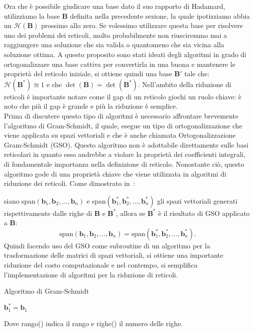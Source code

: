 Ora che è possibile giudicare una base dato il suo rapporto di Hadamard, utilizziamo la base
$\mathbf{B}$ definita nella precedente sezione, la quale ipotizziamo abbia un 
$\mathcal{H}(\mathbf{B})$ prossimo allo zero. Se volessimo utilizzare questa base per risolvere
uno dei problemi dei reticoli, molto probabilmente non riusciremmo mai a raggiungere una soluzione
che sia valida o quantomeno che sia vicina alla soluzione ottima.
A questo proposito sono stati ideati degli algoritmi in grado di ortogonalizzare una base
cattiva per convertirla in una buona e mantenere le proprietà del reticolo iniziale, si
ottiene quindi una base $\mathbf{B'}$ tale che: 
$\mathcal{H}(\mathbf{B}^*) \approxeq 1$ e che $\det(\mathbf{B}) = \det(\mathbf{B}^*)$.
Nell'ambito della riduzione di reticoli è importante notare come il gap di un reticolo giochi
un ruolo chiave: è noto che più il gap è grande e più la riduzione è semplice.\\

Prima di discutere questo tipo di algoritmi è necessario affrontare brevemente 
l'algoritmo di Gram-Schmidt, il quale, esegue un tipo di ortogonalizzazione che viene applicata
su spazi vettoriali e che è anche chiamata Ortogonalizzazione Gram-Schmidt (GSO).
Questo algoritmo non è adottabile direttamente sulle basi reticolari in quanto esso andrebbe a 
violare la proprietà dei coefficienti integrali, di fondamentale importanza nella
definizione di reticolo. Nonostante ciò, questo algoritmo gode di una proprietà chiave che
viene utilizzata in algoritmi di riduzione dei reticoli. Come dimostrato in~\cite[Teorema 7.13]{HDMRD08}:

siano span$(\mathbf{b}_1, \mathbf{b}_2, \dots, \mathbf{b}_n)$ e 
span$(\mathbf{b}_1^*, \mathbf{b}_2^*, \dots, \mathbf{b}_n^*)$ 
gli spazi vettoriali generati rispettivamente dalle righe di $\mathbf{B}$ e $\mathbf{B}^*$,
allora se $\mathbf{B}^*$ è il risultato di GSO applicato a $\mathbf{B}$:
\[
\text{span}(\mathbf{b}_1, \mathbf{b}_2, \dots, \mathbf{b}_n) =
\text{span}(\mathbf{b}_1^*, \mathbf{b}_2^*, \dots, \mathbf{b}_n^*).
\]
Quindi facendo uso del GSO come subroutine di un algoritmo per la trasformazione delle 
matrici di spazi vettoriali, si ottiene una importante riduzione del costo computazionale 
e nel contempo, si semplifica l'implementazione di algoritmi per la riduzione di reticoli.

\begin{algorithm}
    \caption{Algoritmo di Gram-Schmidt}
    \label{alg:one}
    \large
    \DontPrintSemicolon
    $\mathbf{b}_1^* = \mathbf{b}_1$\;
\end{algorithm}
Dove rango() indica il rango e righe() il numero delle righe. 


